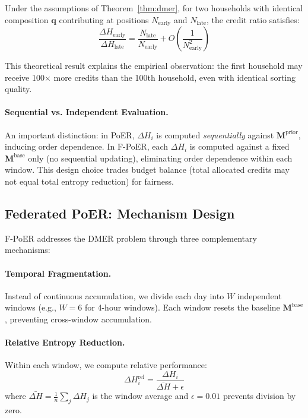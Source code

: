 \documentclass[12pt,a4paper]{article}
\begin{document}
\begin{corollary}
\label{cor:fma}
Under the assumptions of Theorem~\ref{thm:dmer}, for two households with identical composition $\mathbf{q}$ contributing at positions $N_{\text{early}}$ and $N_{\text{late}}$, the credit ratio satisfies:
\begin{equation}
\frac{\Delta H_{\text{early}}}{\Delta H_{\text{late}}} = \frac{N_{\text{late}}}{N_{\text{early}}} + O\left(\frac{1}{N_{\text{early}}^2}\right)
\end{equation}
\end{corollary}

This theoretical result explains the empirical observation: the first household may receive 100$\times$ more credits than the 100th household, even with identical sorting quality.

\paragraph{Sequential vs. Independent Evaluation.} An important distinction: in PoER, $\Delta H_i$ is computed \textit{sequentially} against $\mathbf{M}^{\text{prior}}$, inducing order dependence. In F-PoER, each $\Delta H_i$ is computed against a fixed $\mathbf{M}^{\text{base}}$ only (no sequential updating), eliminating order dependence within each window. This design choice trades budget balance (total allocated credits may not equal total entropy reduction) for fairness.

\subsection{Federated PoER: Mechanism Design}

F-PoER addresses the DMER problem through three complementary mechanisms:

\paragraph{Temporal Fragmentation.} Instead of continuous accumulation, we divide each day into $W$ independent windows (e.g., $W=6$ for 4-hour windows). Each window resets the baseline $\mathbf{M}^{\text{base}}$, preventing cross-window accumulation.

\paragraph{Relative Entropy Reduction.} Within each window, we compute relative performance:
\begin{equation}
\Delta H_i^{\text{rel}} = \frac{\Delta H_i}{\bar{\Delta H} + \epsilon}
\end{equation}
where $\bar{\Delta H} = \frac{1}{n}\sum_j \Delta H_j$ is the window average and $\epsilon = 0.01$ prevents division by zero.
\end{document}
